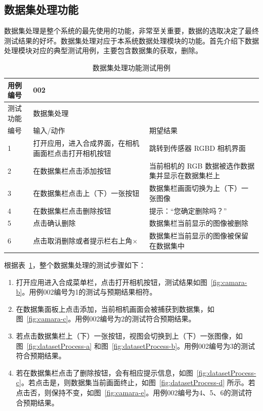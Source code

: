 \subsection{数据集处理功能}
数据集处理是整个系统的最先使用的功能，非常至关重要，数据的选取决定了最终测试结果的好坏。数据集处理对应于本系统数据处理模块的功能。首先介绍下数据处理模块对应的典型测试用例，主要包含数据集的获取，删除。

\begin{table}[t]
  \centering
  \small{}\setlength{}
  \caption{数据集处理功能测试用例}
  \begin{tabular}{|p{2cm}<{\centering}|p{4cm}<{\centering}|p{4cm}<{\centering}|}
    \hline
    用例编号 & \multicolumn{2}{|l|}{002}       \\
    \hline
    测试功能 & \multicolumn{2}{|l|}{数据集处理}       \\
    \hline
    编号 & 输入/动作 & 期望结果 \\
    \hline
    1 & 打开应用，进入合成界面，在相机画面栏点击打开相机按钮 & 跳转到传感器 RGBD 相机界面 \\
    \hline
    2 & 在数据集栏点击添加按钮 & 当前相机的 RGB 数据被选作数据集并显示在数据集栏上 \\
    \hline
    3 & 在数据集栏点击上（下）一张按钮 & 数据集栏画面切换为上（下）一张图像 \\
    \hline
    4 & 在数据集栏点击删除按钮 & 提示：“您确定删除吗？” \\
    \hline
    5 & 点击确认删除 & 数据集栏当前显示的图像被删除 \\
    \hline
    6 & 点击取消删除或者提示栏右上角$\times$ & 数据集栏当前显示的图像被保留在数据集中 \\
    \hline
  \end{tabular}
  \label{tab:getdataset}
\end{table}

根据表~\ref{tab:getdataset}，整个数据集处理的测试步骤如下：
\begin{enumerate}
    \item[1)] 打开应用进入合成菜单栏，点击打开相机按钮，测试结果如图~\ref{fig:camara-b}。用例002编号为1的测试与预期结果相符。
    \item[2)] 在数据集面板上点击添加，当前相机画面会被捕获到数据集，如图~\ref{fig:camara-c}。用例002编号为2的测试符合预期结果。
    \item[3)] 若点击数据集栏上（下）一张按钮，视图会切换到上（下）一张图像，如图~\ref{fig:datasetProcess-a} 和图~\ref{fig:datasetProcess-b}。用例002编号为3的测试符合预期结果。
    \item[4)] 若在数据集栏点击了删除按钮，会有相应提示信息，如图~\ref{fig:datasetProcess-c}。若点击是，则数据集当前画面终止，如图~\ref{fig:datasetProcess-d} 所示。若点击否，则保持不变，如图~\ref{fig:camara-e}。用例002编号为4、5、6的测试符合预期结果。
\end{enumerate}

